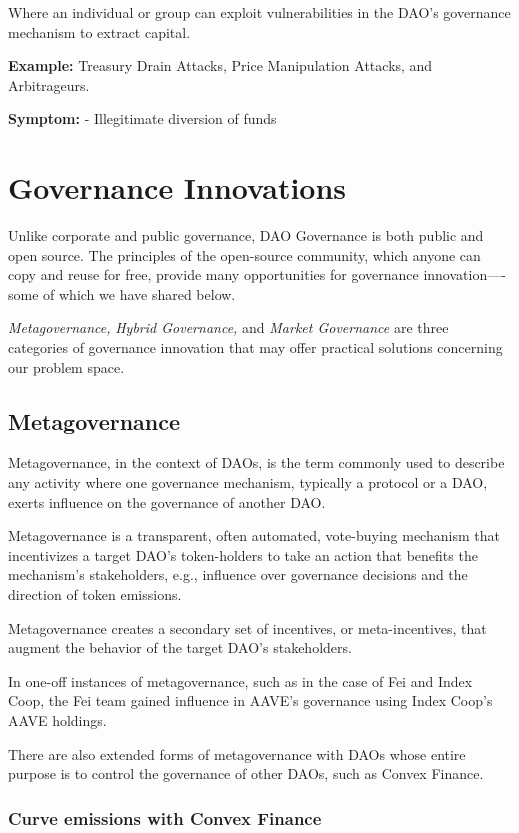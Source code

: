 \documentclass[
]{article}
\begin{document}
Where an individual or group can exploit vulnerabilities in the DAO's
governance mechanism to extract capital.

\textbf{Example:} Treasury Drain Attacks, Price Manipulation Attacks,
and Arbitrageurs.

\textbf{Symptom:} - Illegitimate diversion of funds
\hypertarget{governance-innovations}{%
\section{Governance Innovations}\label{governance-innovations}}

Unlike corporate and public governance, DAO Governance is both public
and open source. The principles of the open-source community, which
anyone can copy and reuse for free, provide many opportunities for
governance innovation----some of which we have shared below.

\emph{Metagovernance,} \emph{Hybrid Governance,} and \emph{Market
Governance} are three categories of governance innovation that may offer
practical solutions concerning our problem space.

\hypertarget{metagovernance}{%
\subsection{Metagovernance}\label{metagovernance}}

Metagovernance, in the context of DAOs, is the term commonly used to
describe any activity where one governance mechanism, typically a
protocol or a DAO, exerts influence on the governance of another DAO.

Metagovernance is a transparent, often automated, vote-buying mechanism
that incentivizes a target DAO's token-holders to take an action that
benefits the mechanism's stakeholders, e.g., influence over governance
decisions and the direction of token emissions.

Metagovernance creates a secondary set of incentives, or
meta-incentives, that augment the behavior of the target DAO's
stakeholders.

In one-off instances of metagovernance, such as in the case of Fei and
Index Coop, the Fei team gained influence in AAVE's governance using
Index Coop's AAVE holdings.

There are also extended forms of metagovernance with DAOs whose entire
purpose is to control the governance of other DAOs, such as Convex
Finance.

\hypertarget{curve-emissions-with-convex-finance}{%
\subsubsection{Curve emissions with Convex
Finance}\label{curve-emissions-with-convex-finance}}
\end{document}
